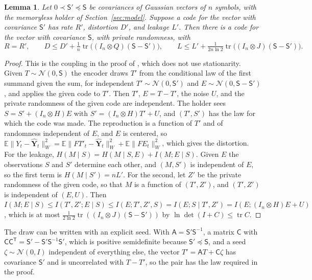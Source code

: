 \documentclass[11pt,onecolumn]{IEEEtran}
\newtheorem{lemma}[theorem]{Lemma}
\newcommand{\E}{\mathbb{E}}
\newcommand{\tr}{\operatorname{tr}}
\newcommand{\hY}{\hat{\mathbf Y}}
\begin{document}
\begin{lemma}\label{lem:coupling}
Let $0\prec\mathsf S'\preceq\mathsf S$ be covariances of Gaussian
vectors of $n$ symbols, with the memoryless holder of
Section~\ref{sec:model}.
Suppose a code for the vector with covariance $\mathsf S'$ has rate
$R'$, distortion $D'$, and leakage $L'$. Then there is a code for the
vector with covariance $\mathsf S$, with private randomness, with
\[
R=R',\qquad D\le D'+\tfrac1n\tr\bigl((I_n\otimes Q)(\mathsf S-\mathsf S')\bigr),\qquad
L\le L'+\tfrac1{2n\ln2}\tr\bigl((I_n\otimes J)(\mathsf S-\mathsf S')\bigr).
\]
\end{lemma}

\begin{proof}
This is the coupling in the proof of \cite[Theorem~16]{part2}, which
does not use stationarity. Given $T\sim\mathcal N(0,\mathsf S)$ the
encoder draws $T'$ from the conditional law of the first summand
given the sum, for independent $T'\sim\mathcal N(0,\mathsf S')$ and
$E\sim\mathcal N(0,\mathsf S-\mathsf S')$, and applies the given code to
$T'$. Then $T'$, $E=T-T'$, the noise $U$, and the private randomness
of the given code are independent. The holder sees
$S=S'+(I_n\otimes H)E$ with $S'=(I_n\otimes H)T'+U$, and $(T',S')$ has
the law for which the code was made. The reproduction is a function of
$T'$ and of randomness independent of $E$, and $E$ is centered, so
$\E\|Y_t-\hY_t\|_W^2=\E\|FT'_t-\hY_t\|_W^2+\E\|FE_t\|_W^2$, which gives
the distortion. For the leakage,
$H(M\mid S)=H(M\mid S,E)+I(M;E\mid S)$. Given $E$ the observations $S$
and $S'$ determine each other, and $(M,S')$ is independent of $E$, so
the first term is $H(M\mid S')=nL'$. For the second, let $Z'$ be the
private randomness of the given code, so that $M$ is a function of
$(T',Z')$, and $(T',Z')$ is independent of $(E,U)$. Then
$I(M;E\mid S)\le I(T',Z';E\mid S)\le I(E;T',Z',S)=I(E;S\mid T',Z')=I(E;(I_n\otimes H)E+U)$,
which is at most
$\tfrac1{2\ln2}\tr((I_n\otimes J)(\mathsf S-\mathsf S'))$ by
$\ln\det(I+C)\le\tr C$.
\end{proof}

The draw can be written with an explicit seed. With
$\mathsf A=\mathsf S'\mathsf S^{-1}$, a matrix $\mathsf C$ with
$\mathsf C\mathsf C^{\mathsf T}=\mathsf S'-\mathsf S'\mathsf S^{-1}\mathsf S'$,
which is positive semidefinite because $\mathsf S'\preceq\mathsf S$, and
a seed $\zeta\sim\mathcal N(0,I)$ independent of everything else, the
vector $T'=\mathsf AT+\mathsf C\zeta$ has covariance $\mathsf S'$ and is
uncorrelated with $T-T'$, so the pair has the law required in the
proof.
\end{document}
